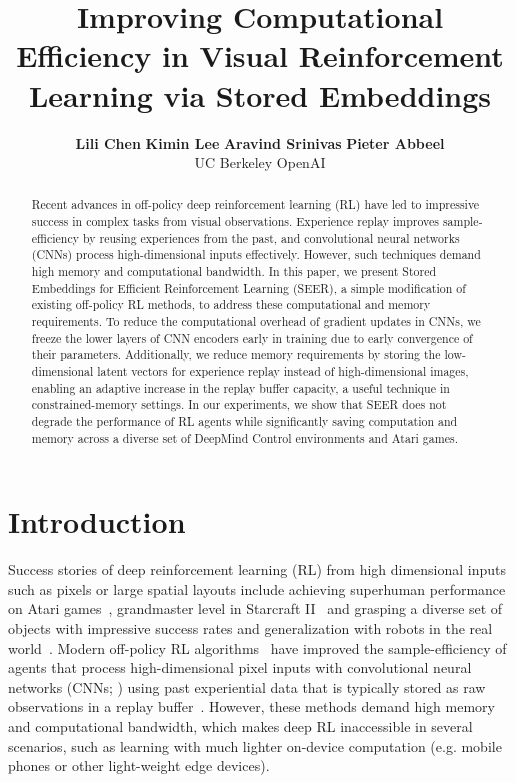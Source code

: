 \documentclass{article}
\title{Improving Computational Efficiency in Visual Reinforcement Learning via Stored Embeddings}
\author{\qquad
  \textbf{Lili Chen}
  \qquad
  \textbf{Kimin Lee}
  \qquad
  \textbf{Aravind Srinivas}
  \qquad
  \textbf{Pieter Abbeel}
  \qquad
  \\
  UC Berkeley \vspace{.1em} \hspace{4pt}
  OpenAI \vspace{.1em} \hspace{4pt}
}
\begin{document}
\maketitle

\begin{abstract}
Recent advances in off-policy deep reinforcement learning (RL) have led to impressive success in complex tasks from visual observations. Experience replay improves sample-efficiency by reusing experiences from the past, and convolutional neural networks (CNNs) process high-dimensional inputs effectively. However, such techniques demand high memory and computational bandwidth. In this paper, we present Stored Embeddings for Efficient Reinforcement Learning (SEER), a simple modification of existing off-policy RL methods, to address these computational and memory requirements.
To reduce the computational overhead of gradient updates in CNNs, we freeze the lower layers of CNN encoders early in training due to early convergence of their parameters. Additionally, we reduce memory requirements by storing the low-dimensional latent vectors for experience replay instead of high-dimensional images, enabling an adaptive increase in the replay buffer capacity, a useful technique in constrained-memory settings. In our experiments, we show that SEER does not degrade the performance of RL agents while significantly saving computation and memory across a diverse set of DeepMind Control environments and Atari games. 

\end{abstract}

\section{Introduction}
Success stories of deep reinforcement learning (RL) from high dimensional inputs such as pixels or large spatial layouts include achieving superhuman performance on Atari games~\citep{mnih2015human, schrittwieser2019mastering,  badia2020agent57}, grandmaster level in Starcraft II~\citep{vinyals2019grandmaster} and grasping a diverse set of objects with impressive success rates and generalization with robots in the real world~\citep{kalashnikov2018qt}.
Modern off-policy RL algorithms~\citep{mnih2015human, hessel2018rainbow, hafner2018learning, hafner2019dream, srinivas2020curl, kostrikov2020image, laskin2020reinforcement} have improved the sample-efficiency of agents that process high-dimensional pixel inputs with convolutional neural networks (CNNs; \citealt{lecun1998gradient}) using past experiential data that is typically stored as raw observations in a replay buffer~\citep{lin1992self}.
However, these methods demand high memory and computational bandwidth, which makes deep RL inaccessible in several scenarios, such as learning with much lighter on-device computation (e.g. mobile phones or other light-weight edge devices).
\end{document}
